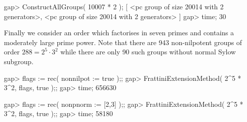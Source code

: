 gap> ConstructAllGroups( 10007 * 2 );
[ <pc group of size 20014 with 2 generators>, 
  <pc group of size 20014 with 2 generators> ]
gap> time;
30
\endexample

Finally we consider an order which factorises in seven primes and
contains a moderately large prime power. Note that there are 943
non-nilpotent groups of order $288 = 2^5 \cdot 3^2$ while there
are only 90 such groups without normal Sylow subgroup.

\beginexample
gap> flags := rec( nonnilpot := true );;
gap> FrattiniExtensionMethod( 2^5 * 3^2, flags, true );;
gap> time;
656630

gap> flags := rec( nonpnorm := [2,3] );;
gap> FrattiniExtensionMethod( 2^5 * 3^2, flags, true );;
gap> time;
58180
\endexample

